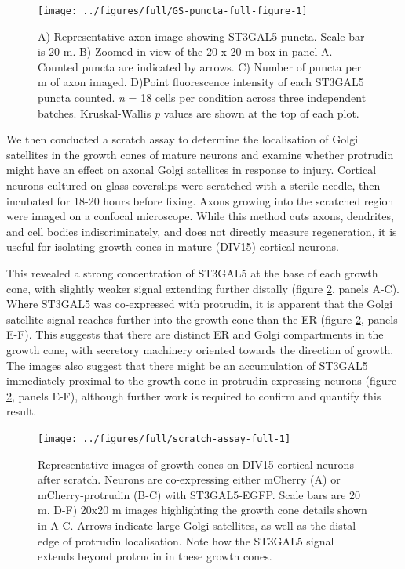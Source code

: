 \documentclass[
  12pt,
  a4paper,
]{book}
\begin{document}
\begin{figure}
\texttt{[image: ../figures/full/GS-puncta-full-figure-1]} \caption[Protrudin effect on Golgi satellite abundance and size in the distal axon]{A) Representative axon image showing ST3GAL5 puncta. Scale bar is 20 \textmu{}m. B) Zoomed-in view of the 20 x 20 \textmu{}m box in panel A. Counted puncta are indicated by arrows. C) Number of puncta per \textmu{}m of axon imaged. D)Point fluorescence intensity of each ST3GAL5 puncta counted. \emph{n} = 18 cells per condition across three independent batches. Kruskal-Wallis \emph{p} values are shown at the top of each plot.}\label{fig:GS-puncta-full-figure}
\end{figure}

We then conducted a scratch assay to determine the localisation of Golgi satellites in the growth cones of mature neurons and examine whether protrudin might have an effect on axonal Golgi satellites in response to injury. Cortical neurons cultured on glass coverslips were scratched with a sterile needle, then incubated for 18-20 hours before fixing. Axons growing into the scratched region were imaged on a confocal microscope. While this method cuts axons, dendrites, and cell bodies indiscriminately, and does not directly measure regeneration, it is useful for isolating growth cones in mature (DIV15) cortical neurons.

This revealed a strong concentration of ST3GAL5 at the base of each growth cone, with slightly weaker signal extending further distally (figure \ref{fig:scratch-assay-full}, panels A-C). Where ST3GAL5 was co-expressed with protrudin, it is apparent that the Golgi satellite signal reaches further into the growth cone than the ER (figure \ref{fig:scratch-assay-full}, panels E-F). This suggests that there are distinct ER and Golgi compartments in the growth cone, with secretory machinery oriented towards the direction of growth. The images also suggest that there might be an accumulation of ST3GAL5 immediately proximal to the growth cone in protrudin-expressing neurons (figure \ref{fig:scratch-assay-full}, panels E-F), although further work is required to confirm and quantify this result.

\begin{figure}
\texttt{[image: ../figures/full/scratch-assay-full-1]} \caption[Scratch assay of neurons co-expressing protrudin and ST3GAL5]{Representative images of growth cones on DIV15 cortical neurons after scratch.  Neurons are co-expressing either mCherry (A) or mCherry-protrudin (B-C) with ST3GAL5-EGFP.  Scale bars are 20 \textmu{}m.  D-F) 20x20 \textmu{}m images highlighting the growth cone details shown in A-C.  Arrows indicate large Golgi satellites, as well as the distal edge of protrudin localisation.  Note how the ST3GAL5 signal extends beyond protrudin in these growth cones.}\label{fig:scratch-assay-full}
\end{figure}
\end{document}
